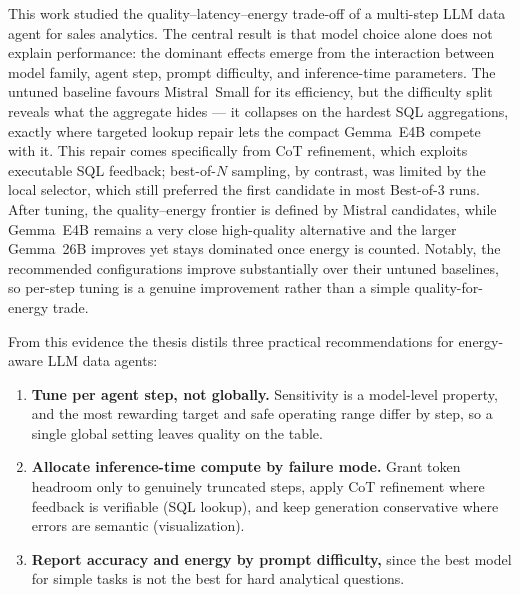 \documentclass[11pt,a4paper,twocolumn]{article}
\begin{document}
This work studied the quality--latency--energy trade-off of a multi-step LLM data agent for
sales analytics. The central result is that model choice alone does not explain performance:
the dominant effects emerge from the interaction between model family, agent step, prompt
difficulty, and inference-time parameters. The untuned baseline favours Mistral~Small for its
efficiency, but the difficulty split reveals what the aggregate hides --- it collapses on the
hardest SQL aggregations, exactly where targeted lookup repair lets the compact Gemma~E4B
compete with it. This repair comes specifically from CoT refinement, which exploits executable
SQL feedback; best-of-$N$ sampling, by contrast, was limited by the local selector, which
still preferred the first candidate in most Best-of-3 runs. After tuning, the
quality--energy frontier is defined by Mistral candidates, while Gemma~E4B remains a very
close high-quality alternative and the larger Gemma~26B improves yet stays dominated once
energy is counted. Notably, the recommended configurations improve substantially over their
untuned baselines, so per-step tuning is a genuine improvement rather than a simple
quality-for-energy trade.

From this evidence the thesis distils three practical recommendations for energy-aware LLM
data agents:

\begin{enumerate}[noitemsep,topsep=2pt]
    \item \textbf{Tune per agent step, not globally.} Sensitivity is a model-level property,
          and the most rewarding target and safe operating range differ by step, so a single
          global setting leaves quality on the table.
    \item \textbf{Allocate inference-time compute by failure mode.} Grant token headroom only
          to genuinely truncated steps, apply CoT refinement where feedback is verifiable
          (SQL lookup), and keep generation conservative where errors are semantic
          (visualization).
    \item \textbf{Report accuracy and energy by prompt difficulty,} since the best model for
          simple tasks is not the best for hard analytical questions.
\end{enumerate}


\end{document}
